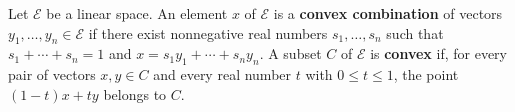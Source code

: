 Let $\mathcal{E}$ be a linear space. An element $x$ of $\mathcal{E}$ is a \textbf{convex combination} of vectors $y_1, \ldots, y_n \in \mathcal{E}$ if there exist nonnegative real numbers $s_1, \ldots, s_n$ such that $s_1 + \cdots + s_n = 1$ and $x = s_1 y_1 + \cdots + s_n y_n$. A subset $C$ of $\mathcal{E}$ is \textbf{convex} if, for every pair of vectors $x, y \in C$ and every real number $t$ with $0 \leq t \leq 1$, the point $(1-t)x + ty$ belongs to $C$.
